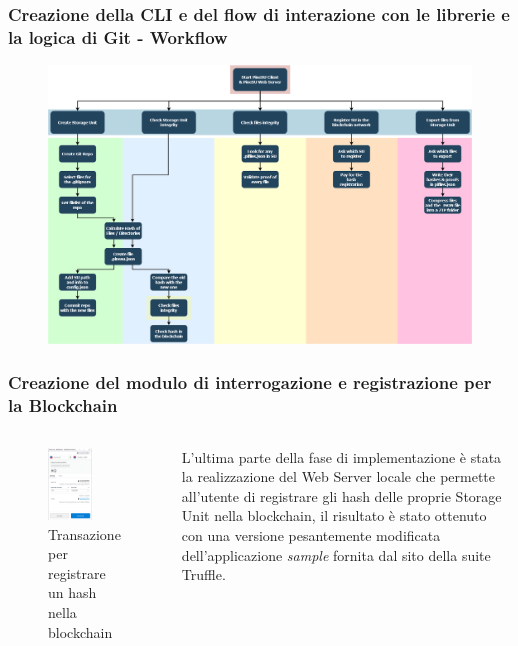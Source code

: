 \documentclass{beamer}
\begin{document}
\begin{frame}
	\frametitle{Creazione della CLI e del flow di interazione con le librerie e la logica di Git - Workflow}
	\begin{figure}
		\includegraphics[width=1\textwidth]{figures/workflow.png}
	\end{figure}
\end{frame}
\begin{frame}
	\frametitle{Creazione del modulo di interrogazione e registrazione per la Blockchain}
	\begin{columns}
		\begin{figure}
			\includegraphics[width=0.6\textwidth]{figures/meta-gui.png}
			\caption{Transazione per registrare un hash nella blockchain}
		\end{figure}
		L’ultima parte della fase di implementazione è stata la realizzazione del Web Server locale che permette all’utente di registrare gli hash delle proprie Storage Unit nella blockchain, il risultato è stato ottenuto con una versione pesantemente modificata dell’applicazione \emph{sample} fornita dal sito della suite Truffle.
	\end{columns}
\end{frame}
\end{document}
